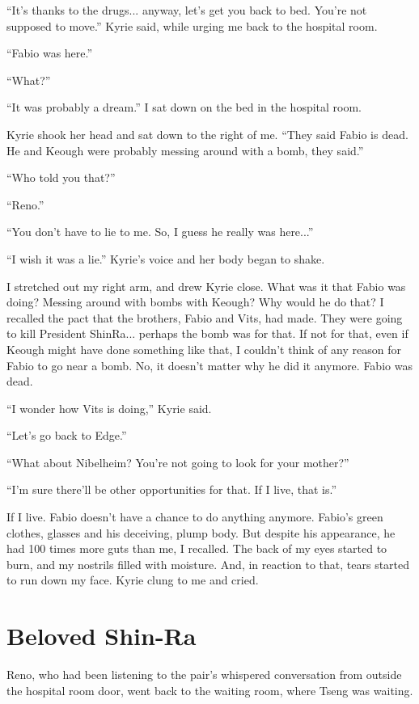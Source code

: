 \documentclass[oneside]{book}
\begin{document}
“It’s thanks to the drugs... anyway, let’s get you back to bed. You’re not supposed to move.” Kyrie said, while urging me back to the hospital room.

“Fabio was here.”

“What?”

“It was probably a dream.” I sat down on the bed in the hospital room.

Kyrie shook her head and sat down to the right of me. “They said Fabio is dead. He and Keough were probably messing around with a bomb, they said.”

“Who told you that?”

“Reno.”

“You don’t have to lie to me. So, I guess he really was here...”

“I wish it was a lie.” Kyrie’s voice and her body began to shake.

I stretched out my right arm, and drew Kyrie close. What was it that Fabio was doing? Messing around with bombs with Keough? Why would he do that? I recalled the pact that the brothers, Fabio and Vits, had made. They were going to kill President ShinRa... perhaps the bomb was for that. If not for that, even if Keough might have done something like that, I couldn’t think of any reason for Fabio to go near a bomb. No, it doesn’t matter why he did it anymore. Fabio was dead.

“I wonder how Vits is doing,” Kyrie said.

“Let’s go back to Edge.”

“What about Nibelheim? You’re not going to look for your mother?”

“I’m sure there’ll be other opportunities for that. If I live, that is.”

If I live. Fabio doesn’t have a chance to do anything anymore. Fabio’s green clothes, glasses and his deceiving, plump body. But despite his appearance, he had 100 times more guts than me, I recalled. The back of my eyes started to burn, and my nostrils filled with moisture. And, in reaction to that, tears started to run down my face. Kyrie clung to me and cried.

\chapter{Beloved Shin-Ra}
Reno, who had been listening to the pair’s whispered conversation from outside the hospital room door, went back to the waiting room, where Tseng was waiting.
\end{document}

